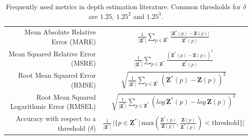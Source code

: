 \begingroup
\renewcommand{\arraystretch}{2.}
\begin{table}
	\begin{adjustwidth}{-0.2\textwidth}{-0.2\textwidth}
	\centering
	\begin{tabular}{r|c}
	Mean Absolute Relative Error (MARE) & $\frac{1}{\big| \mathbf{Z}^{*} \big|}\sum_{p \in \mathbf{Z}^{*}} \frac {\big| \mathbf{Z}^{*}(p) - \mathbf{Z}(p) \big|} {\mathbf{Z}^{*}(p)}$ \\
	Mean Squared Relative Error (MSRE) & $\frac{1}{\big| \mathbf{Z}^{*} \big|}\sum_{p \in \mathbf{Z}^{*}} \frac {\left( \mathbf{Z}^{*}(p) - \mathbf{Z}(p) \right)^{2}} {\mathbf{Z}^{*}(p)}$ \\
	Root Mean Squared Error (RMSE) & $\sqrt{
		\frac{1}{\big| \mathbf{Z}^{*} \big|}\sum_{p \in \mathbf{Z}^{*}} \left( \mathbf{Z}^{*}(p) - \mathbf{Z}(p) \right)^{2}
	}$ \\
	Root Mean Squared Logarithmic Error (RMSEL) & $\sqrt{
		\frac{1}{\big| \mathbf{Z}^{*} \big|}\sum_{p \in \mathbf{Z}^{*}} \left( log \, \mathbf{Z}^{*}(p) - log \, \mathbf{Z}(p) \right)^{2}
	}$ \\
	Accuracy with respect to a threshold ($\delta$) & $\frac{1}{\big| \mathbf{Z}^{*} \big|} \, \big| \{p \in \mathbf{Z}^{*} \, | \, \text{max}(
		\frac{\mathbf{Z}^{*}(p)}{\mathbf{Z}(p)},
		\frac{\mathbf{Z}(p)}{\mathbf{Z}^{*}(p)}
	) < \text{threshold} \} \big| $\\
	\end{tabular}
\end{adjustwidth}
\caption{
    Frequently used metrics in depth estimation literature.
    Common thresholds for $\delta$ are $1.25$, $1.25^{2}$ and $1.25^{3}$.
    \label{t:metrics}}
\end{table}
\endgroup

